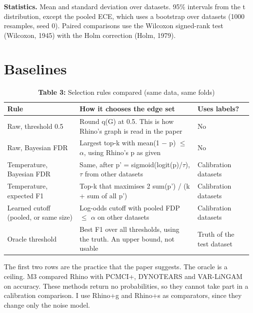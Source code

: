 \documentclass[10pt]{article}
\begin{document}
\textbf{Statistics.} Mean and standard deviation over datasets. 95\% intervals from the t distribution, except the pooled ECE, which uses a bootstrap over datasets (1000 resamples, seed 0). Paired comparisons use the Wilcoxon signed-rank test (Wilcoxon, 1945) with the Holm correction (Holm, 1979).

\section{Baselines}
\begin{table}[!ht]\centering
\captionsetup{type=table}\caption*{\textbf{Table 3:} Selection rules compared (same data, same folds)}
\footnotesize
\begin{tabular}{>{\raggedright\arraybackslash}p{1.45in}>{\raggedright\arraybackslash}p{2.98in}>{\raggedright\arraybackslash}p{0.80in}}\toprule
\textbf{Rule} & \textbf{How it chooses the edge set} & \textbf{Uses labels?} \\ \midrule
Raw, threshold 0.5 & Round q(G) at 0.5. This is how Rhino's graph is read in the paper & No \\
Raw, Bayesian FDR & Largest top-k with mean(1 $-$ p) $\le$ $\alpha$, using Rhino's p as given & No \\
Temperature, Bayesian FDR & Same, after p' = sigmoid(logit(p)/$\tau$), $\tau$ from other datasets & Calibration datasets \\
Temperature, expected F1 & Top-k that maximises 2 sum(p') / (k + sum of all p') & Calibration datasets \\
Learned cutoff (pooled, or same size) & Log-odds cutoff with pooled FDP $\le$ $\alpha$ on other datasets & Calibration datasets \\
Oracle threshold & Best F1 over all thresholds, using the truth. An upper bound, not usable & Truth of the test dataset \\
\bottomrule\end{tabular}
\end{table}
The first two rows are the practice that the paper suggests. The oracle is a ceiling. M3 compared Rhino with PCMCI+, DYNOTEARS and VAR-LiNGAM on accuracy. These methods return no probabilities, so they cannot take part in a calibration comparison. I use Rhino+g and Rhino+s as comparators, since they change only the noise model.
\end{document}
